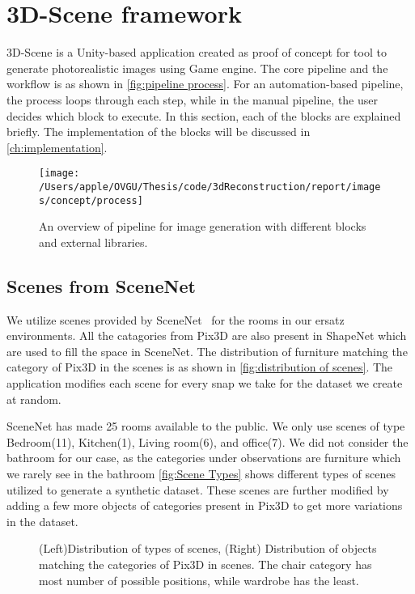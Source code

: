 \section{3D-Scene framework}\label{sec:3d-scene-framework}
3D-Scene is a Unity-based application created as proof of concept for tool to generate photorealistic images using Game engine.
The core pipeline and the workflow is as shown in \autoref{fig:pipeline process}.
For an automation-based pipeline, the process loops through each step, while in the manual pipeline, the user decides which block to execute.
In this section, each of the blocks are explained briefly.
The implementation of the blocks will be discussed in \autoref{ch:implementation}.

\begin{figure}[!ht]
    \centering
    \texttt{[image: /Users/apple/OVGU/Thesis/code/3dReconstruction/report/images/concept/process]}
    \caption{An overview of pipeline for image generation with different blocks and external libraries.}
    \label{fig:pipeline process}
\end{figure}

\subsection{Scenes from SceneNet}\label{subsec:scenes-from-scenenet}
We utilize scenes provided by SceneNet~\cite{McCormac2017} for the rooms in our ersatz environments.
All the catagories from Pix3D are also present in ShapeNet which are used to fill the space in SceneNet.
The distribution of furniture matching the category of Pix3D in the scenes is as shown in \autoref{fig:distribution of scenes}.
The application modifies each scene for every snap we take for the dataset we create at random.

SceneNet has made 25 rooms available to the public.
We only use scenes of type Bedroom(11), Kitchen(1), Living room(6), and office(7).
We did not consider the bathroom for our case, as the categories under observations are furniture which we rarely see in the bathroom
\autoref{fig:Scene Types} shows different types of scenes utilized to generate a synthetic dataset.
These scenes are further modified by adding a few more objects of categories present in Pix3D to get more variations in the dataset.

\begin{figure}[!ht]
    \resizebox{0.49\textwidth}{6cm}{}
    \resizebox{0.49\textwidth}{6cm}{}
    \caption{(Left)Distribution of types of scenes, (Right) Distribution of objects matching the categories of Pix3D in scenes.
    The chair category has most number of possible positions, while wardrobe has the least.}
    \label{fig:distribution of scenes}
\end{figure}

